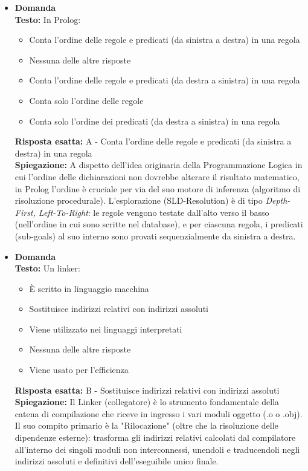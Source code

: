 \documentclass[12pt, a4paper]{article}
\newcounter{domandateoria}
\begin{document}
\begin{itemize}
    \item {}\textbf{Domanda \thedomandateoria} \\
    \textbf{Testo:} In Prolog:
    \begin{itemize}
        \item[A)] Conta l'ordine delle regole e predicati (da sinistra a destra) in una regola
        \item[B)] Nessuna delle altre risposte
        \item[C)] Conta l'ordine delle regole e predicati (da destra a sinistra) in una regola
        \item[D)] Conta solo l'ordine delle regole
        \item[E)] Conta solo l'ordine dei predicati (da destra a sinistra) in una regola
    \end{itemize}
    \textbf{Risposta esatta:} A - Conta l'ordine delle regole e predicati (da sinistra a destra) in una regola \\
    \textbf{Spiegazione:} A dispetto dell'idea originaria della Programmazione Logica in cui l'ordine delle dichiarazioni non dovrebbe alterare il risultato matematico, in Prolog l'ordine è cruciale per via del suo motore di inferenza (algoritmo di risoluzione procedurale). L'esplorazione (SLD-Resolution) è di tipo \textit{Depth-First, Left-To-Right}: le regole vengono testate dall'alto verso il basso (nell'ordine in cui sono scritte nel database), e per ciascuna regola, i predicati (sub-goals) al suo interno sono provati sequenzialmente da sinistra a destra.
    \vspace{0.3cm}

    \item {}\textbf{Domanda \thedomandateoria} \\
    \textbf{Testo:} Un linker:
    \begin{itemize}
        \item[A)] È scritto in linguaggio macchina
        \item[B)] Sostituisce indirizzi relativi con indirizzi assoluti
        \item[C)] Viene utilizzato nei linguaggi interpretati
        \item[D)] Nessuna delle altre risposte
        \item[E)] Viene usato per l'efficienza
    \end{itemize}
    \textbf{Risposta esatta:} B - Sostituisce indirizzi relativi con indirizzi assoluti \\
    \textbf{Spiegazione:} Il Linker (collegatore) è lo strumento fondamentale della catena di compilazione che riceve in ingresso i vari moduli oggetto (.o o .obj). Il suo compito primario è la "Rilocazione" (oltre che la risoluzione delle dipendenze esterne): trasforma gli indirizzi relativi calcolati dal compilatore all'interno dei singoli moduli non interconnessi, unendoli e traducendoli negli indirizzi assoluti e definitivi dell'eseguibile unico finale.
    \vspace{0.3cm}
\end{itemize}
\end{document}
